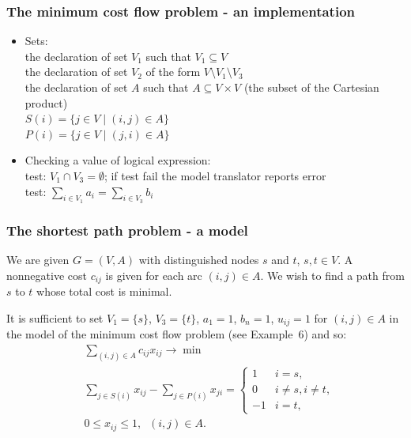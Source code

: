 \documentclass[landscape]{beamer}
\begin{document}
\begin{frame}[fragile]
  \frametitle{The minimum cost flow problem - an implementation}  
\begin{footnotesize}
\begin{itemize}
\item Sets:\\
\texttt{} the declaration of set $V_1$ such that $V_1 \subseteq V$\\
\texttt{}
           the declaration of set $V_2$ of the form $V \setminus V_1\setminus V_3$\\
\texttt{}          
the declaration of set $A$ such that $A \subseteq V\times V$ (the subset of the Cartesian
product)\\
\texttt{}  $S(i)=\{j \in V\;|\; (i,j)\in A\} $\\
\texttt{}   $P(i)=\{j\in V \;|\; (j,i)\in A\}$
\item Checking a value of logical expression:\\
\texttt{}      test: $V_1 \cap V_3=\emptyset$; 
if test fail the model translator reports error\\
\texttt{} 
test: $\sum_{i\in V_1}a_i=\sum_{i\in V_3} b_i$
\end{itemize}

\end{footnotesize}
\end{frame}

\begin{frame}[fragile]
  \frametitle{The shortest path problem - a model}   
\begin{footnotesize}
We are given $G=(V,A)$ with distinguished
nodes $s$ and $t$, $s,t\in V$. A nonnegative cost $c_{ij}$ is given for each
arc $(i,j)\in A$. We wish to find a path from $s$ to $t$ whose total cost is minimal.

It is sufficient  to set $V_1=\{s\}$, $V_3=\{t\}$,
$a_1=1$, $b_n=1$, $u_{ij}=1$ for $(i,j)\in A$ in the model of
the minimum cost flow problem (see Example~6) and so:
\begin{align*}
 &\sum_{(i,j)\in A}c_{ij}x_{ij}\rightarrow \min\\
&\sum_{j\in S(i)}x_{ij}-
\sum_{j\in P(i)}x_{ji}=
\left\{
\begin{array}{rl}
1 & i=s,\\
0       & i\not =s, i\not =t, \\
 -1& i=t, 
\end{array}
\right. \\
&0\leq x_{ij}\leq 1, \;\; (i,j)\in A.
\end{align*}


\end{footnotesize} 
\end{frame}
\end{document}
